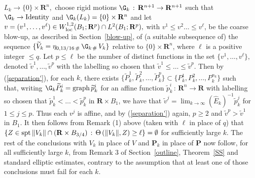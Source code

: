 \documentclass[a4paper,11pt]{amsart}
\begin{document}
$L_{k} \to \{0\} \times {\mathbf R}^{n},$ choose rigid motions $\G_{k} \, : \, {\mathbf R}^{n+1} \to {\mathbf R}^{n+1}$ such that $\G_{k} \to {\rm Identity}$ and $\G_{k}(L_{k}) = \{0\} \times {\mathbf R}^{n}$ and let $v = (v^{1}, \ldots, v^{\ell}) \in W^{1, 2}_{\rm loc}(B_{1}; {\mathbf R}^{p}) \cap L^{2}(B_{1}; {\mathbf R}^{p}),$ with $v^{1} \leq v^{2} \ldots \leq v^{\ell}$, be the coarse blow-up, as described in Section~\ref{blow-up}, of (a suitable subsequence of) the sequence $\{{\widetilde V}_{k} = \eta_{0, 13/16 \, \#} \, \G_{k \, \#} \, V_{k}\}$ relative to $\{0\} \times {\mathbf R}^{n}$, where $\ell$ is a positive integer $\leq q$. Let $p \leq \ell$ be the number of distinct functions in the set $\{v^{1}, \ldots, v^{\ell}\},$ denoted $\widetilde{v}^{1}, \ldots, \widetilde{v}^{p}$ with the labelling so chosen that $\widetilde{v}^{1} \leq \ldots \leq \widetilde{v}^{p}.$ Then by (\ref{separation'}), for each $k$, there exists $\{{\widetilde P}_{k}^{1}, {\widetilde P}_{k}^{2}, \ldots, {\widetilde P}_{k}^{p}\} \subset \{P_{k}^{1}, P_{k}^{2}, \ldots, P_{k}^{n_{k}}\}$ such that, writing $\G_{k}{\widetilde P}_{k}^{i} = {\rm graph} \, \widetilde{p}_{k}^{i}$ for an affine function $\widetilde{p}_{k}^{i} \, : \, {\mathbf R}^{n} \to {\mathbf R}$ with labelling so chosen that $\widetilde{p}_{k}^{1} < \ldots < \widetilde{p}_{k}^{p}$ in ${\mathbf R} \times B_{1}$, we have that $\widetilde{v}^{j} = \lim_{k \to \infty} \left({\hat E}_{k}\right)^{-1}\widetilde{p}_{k}^{j}$ for $ 1 \leq j \leq p.$ Thus each $v^{j}$ is affine, and by (\ref{separation'}) again, $p \geq 2$ and $\widetilde{v}^{p} > \widetilde{v}^{1}$ in $B_{1}.$ It then follows from Remark (1) above (taken with $\ell$ in place of $q$) that $\{Z \in {\rm spt} \, \|V_{k}\| \cap ({\mathbf R} \times B_{3/4}) \, : \, \Theta \, (\|V_{k}\|, Z) \geq \ell\}  = \emptyset$ for sufficiently large $k$. The rest of the conclusions with $V_{k}$ in place of $V$ and ${\mathbf P}_{k}$ in place of ${\mathbf P}$ now follow, for all sufficiently large $k$, from 
Remark 3 of Section~\ref{outline}, Theorem~\ref{SS} and standard elliptic estimates, contrary to the assumption that at least one of those conclusions must fail for each $k$.
  
\end{document}
